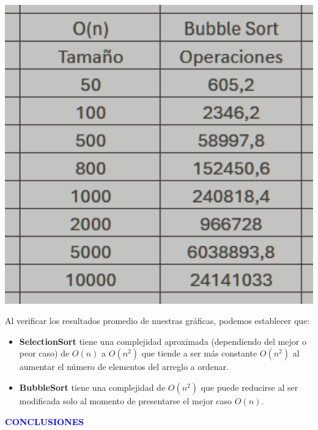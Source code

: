 \documentclass[12pt]{article}
\begin{document}
\par\vspace{0.4cm}
\includegraphics[width=15cm]{Images/Tab_BS.png}
\par\vspace{0.4cm}
Al verificar los resultados promedio de nuestras gráficas, podemos establecer que:
\begin{itemize}
  \item \textbf{SelectionSort} tiene una complejidad aproximada (dependiendo del mejor o peor caso) de \(O(n)\) a \(O(n^2)\) que tiende a ser más constante \(O(n^2)\) al aumentar el número de elementos del arreglo a ordenar.
  \item \textbf{BubbleSort} tiene una complejidad de \(O(n^2)\) que puede reducirse al ser modificada solo al momento de presentarse el mejor caso \(O(n)\).
\end{itemize}

\newpage
\textcolor{blue}{\textbf{CONCLUSIONES}}
\end{document}
